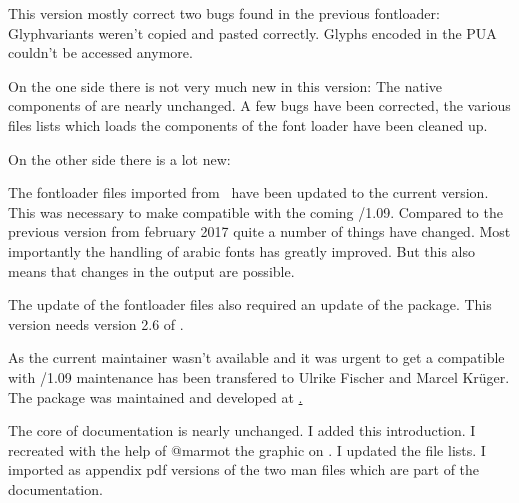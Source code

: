 This version mostly correct two bugs found in the previous fontloader: Glyphvariants weren't copied and pasted correctly. Glyphs encoded in the PUA couldn't be accessed anymore.

\endsubsection



On the one side there is not very much new in this version: The native components of  are nearly unchanged. A few bugs have been corrected, the various files lists which loads the components of the font loader have been cleaned up.

On the other side there is a lot new:

\begindescriptions

   The fontloader files imported from \CONTEXT\ have been updated to the current version.
   This was necessary to make  compatible with the coming /1.09. Compared to the previous version from february 2017 quite a number of things have changed. Most importantly the handling of arabic fonts has greatly improved. But this also means that changes in the output are possible.
  \endaltitem

   The update of the fontloader files also required an update of the  package. This  version needs version 2.6 of .
  \endaltitem

   As the current maintainer wasn't available and it was urgent to get a  compatible with /1.09 maintenance has been transfered to Ulrike Fischer and Marcel Krüger. The package was maintained and developed at \hyperlink{https://github.com/u-fischer/luaotfload}.
  \endaltitem

  The core of documentation is nearly unchanged. I added this introduction. I recreated with the help of @marmot the graphic on \pageref{file-graph}. I updated the file lists. I imported as appendix pdf versions of the two man files which are part of the  documentation.
  \endaltitem

\enddescriptions

\endsubsection
\endsection


